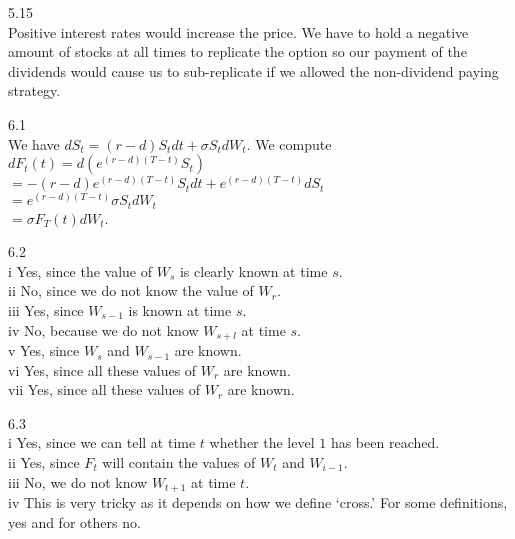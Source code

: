 5.15 \\
Positive interest rates would increase the price. We have to hold a negative amount of stocks at all times to replicate the option so our payment of the dividends would cause us to sub-replicate if we allowed the non-dividend paying strategy.

6.1 \\
We have $dS_t = (r-d) S_t dt + \sigma S_t dW_t$. We compute \\
$dF_t(t)=d(e^{(r-d)(T-t)} S_t)$ \\
$=-(r-d)e^{(r-d)(T-t)} S_t dt + e^{(r-d)(T-t)} dS_t$ \\
$=e^{(r-d)(T-t)} \sigma S_t dW_t$ \\
$=\sigma F_T (t) dW_t$.

6.2 \\
i Yes, since the value of $W_s$ is clearly known at time $s$. \\
ii No, since we do not know the value of $W_r$. \\
iii Yes, since $W_{s-1}$ is known at time $s$. \\
iv No, because we do not know $W_{s+l}$ at time $s$. \\
v Yes, since $W_s$ and $W_{s-1}$ are known. \\
vi Yes, since all these values of $W_r$ are known. \\
vii Yes, since all these values of $W_r$ are known.

6.3 \\
i Yes, since we can tell at time $t$ whether the level $1$ has been reached. \\
ii Yes, since $F_t$ will contain the values of $W_t$ and $W_{i-1}$. \\
iii No, we do not know $W_{t+1}$ at time $t$. \\
iv This is very tricky as it depends on how we define `cross.' For some definitions, yes and for others no.

